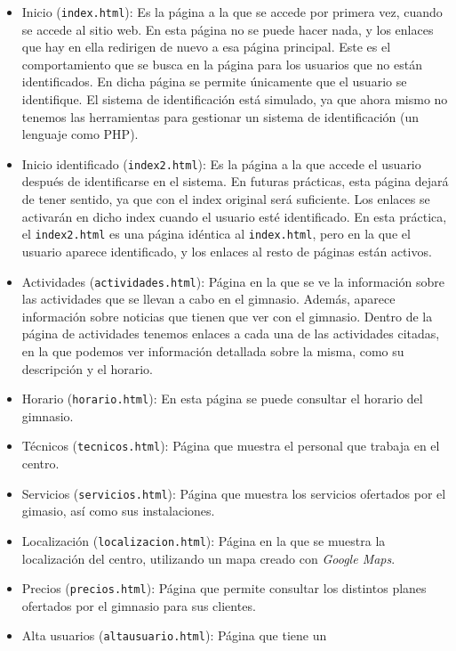 \documentclass[11pt]{article}
\theoremstyle{plain}
\theoremstyle{definition}
\begin{document}
\begin{itemize}
\item Inicio (\texttt{index.html}): Es la página a la que se accede
  por primera vez, cuando se accede al sitio web. En esta página no se
  puede hacer nada, y los enlaces que hay en ella redirigen de nuevo a
  esa página principal. Este es el comportamiento que se busca en la
  página para los usuarios que no están identificados. En dicha página
  se permite únicamente que el usuario se identifique. El sistema de
  identificación está simulado, ya que ahora mismo no tenemos las
  herramientas para gestionar un sistema de identificación (un
  lenguaje como PHP).
\item Inicio identificado (\texttt{index2.html}): Es la página a la
  que accede el usuario después de identificarse en el sistema. En
  futuras prácticas, esta página dejará de tener sentido, ya que con
  el index original será suficiente. Los enlaces se activarán en dicho
  index cuando el usuario esté identificado. En esta práctica, el
  \texttt{index2.html} es una página idéntica al \texttt{index.html},
  pero en la que el usuario aparece identificado, y los enlaces al
  resto de páginas están activos.
\item Actividades (\texttt{actividades.html}): Página en la que se ve
  la información sobre las actividades que se llevan a cabo en el
  gimnasio.  Además, aparece información sobre noticias que tienen que
  ver con el gimnasio.  Dentro de la página de actividades tenemos
  enlaces a cada una de las actividades citadas, en la que podemos ver
  información detallada sobre la misma, como su descripción y el
  horario.
\item Horario (\texttt{horario.html}): En esta página se puede
  consultar el horario del gimnasio.
\item Técnicos (\texttt{tecnicos.html}): Página que muestra el
  personal que trabaja en el centro.
\item Servicios (\texttt{servicios.html}): Página que muestra los
  servicios ofertados por el gimasio, así como sus instalaciones.
\item Localización (\texttt{localizacion.html}): Página en la que se
  muestra la localización del centro, utilizando un mapa creado con
  \textit{Google Maps}.
\item Precios (\texttt{precios.html}): Página que permite consultar
  los distintos planes ofertados por el gimnasio para sus clientes.
\item Alta usuarios (\texttt{altausuario.html}): Página que tiene un

\end{itemize}
\end{document}
